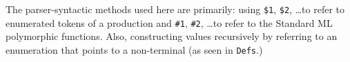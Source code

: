 The parser-syntactic methods used here are primarily: using \verb+$1+,
\verb+$2+, \ldots to refer to enumerated tokens of a production and \verb+#1+,
\verb+#2+, \ldots to refer to the Standard ML polymorphic functions. Also,
constructing values recursively by referring to an enumeration that points to a
non-terminal (as seen in \verb+Defs+.)
